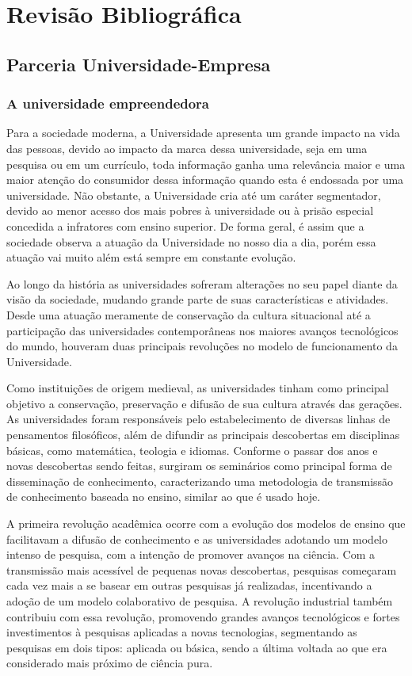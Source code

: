 \chapter[Revisão Bibliográfica]{Revisão Bibliográfica}
\label{chap:revisao}
\section{Parceria Universidade-Empresa}
\label{cha:ensino}
\subsection{A universidade empreendedora}
\label{cha:univ_empreend}

Para a sociedade moderna, a Universidade apresenta um grande impacto na vida das pessoas, devido ao impacto da marca dessa universidade, seja em uma pesquisa ou em um currículo, toda informação ganha uma relevância maior e uma maior atenção do consumidor dessa informação quando esta é endossada por uma universidade. Não obstante, a Universidade cria até um caráter segmentador, devido ao menor acesso dos mais pobres à universidade ou à prisão especial concedida a infratores com ensino superior. De forma geral, é assim que a sociedade observa a atuação da Universidade no nosso dia a dia, porém essa atuação vai muito além está sempre em constante evolução.

Ao longo da história as universidades sofreram alterações no seu papel diante da visão da sociedade, mudando grande parte de suas características e atividades. Desde uma atuação meramente de conservação da cultura situacional até a participação das universidades contemporâneas nos maiores avanços tecnológicos do mundo, houveram duas principais revoluções no modelo de funcionamento da Universidade. \cite{etzkowitz2001}

Como instituições de origem medieval, as universidades tinham como principal objetivo a conservação, preservação e difusão de sua cultura através das gerações. As universidades foram responsáveis pelo estabelecimento de diversas linhas de pensamentos filosóficos, além de difundir as principais descobertas em disciplinas básicas, como matemática, teologia e idiomas. Conforme o passar dos anos e novas descobertas sendo feitas, surgiram os seminários como principal forma de disseminação de conhecimento, caracterizando uma metodologia de transmissão de conhecimento baseada no ensino, similar ao que é usado hoje. 

A primeira revolução acadêmica ocorre com a evolução dos modelos de ensino que facilitavam a difusão de conhecimento e as universidades adotando um modelo intenso de pesquisa, com a intenção de promover avanços na ciência. Com a transmissão mais acessível de pequenas novas descobertas, pesquisas começaram cada vez mais a se basear em outras pesquisas já realizadas, incentivando a adoção de um modelo colaborativo de pesquisa. A revolução industrial também contribuiu com essa revolução, promovendo grandes avanços tecnológicos e fortes investimentos à pesquisas aplicadas a novas tecnologias, segmentando as pesquisas em dois tipos: aplicada ou básica, sendo a última voltada ao que era considerado mais próximo de ciência pura.

